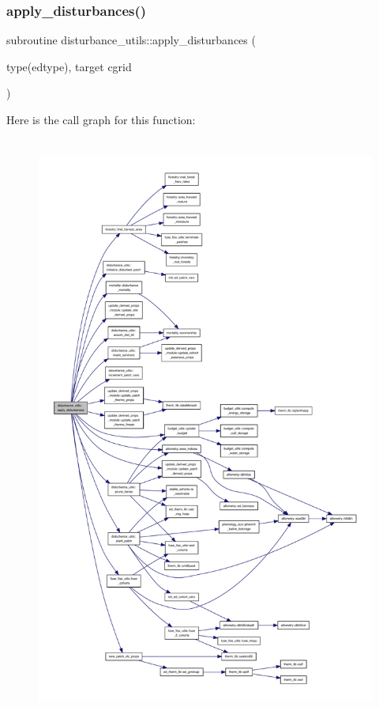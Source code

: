 \subsubsection{\texorpdfstring{apply\+\_\+disturbances()}{apply\_disturbances()}}
{\footnotesize\ttfamily subroutine disturbance\+\_\+utils\+::apply\+\_\+disturbances (\begin{DoxyParamCaption}\item[{type(edtype), target}]{cgrid }\end{DoxyParamCaption})}

Here is the call graph for this function\+:
\nopagebreak
\begin{figure}[H]
\begin{center}
\leavevmode
\includegraphics[height=550pt]{namespacedisturbance__utils_a29d6db4e94463404643e5c3666c67767_cgraph}
\end{center}
\end{figure}
